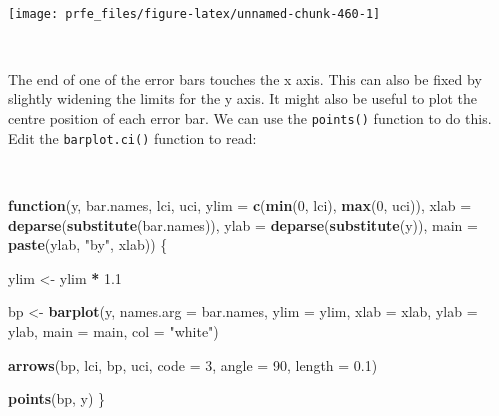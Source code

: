 \documentclass[12pt,a4paper]{book}
\newenvironment{Shaded}{\begin{snugshade}}{\end{snugshade}}
\newcommand{\ControlFlowTok}[1]{\textcolor[rgb]{0.13,0.29,0.53}{\textbf{#1}}}
\newcommand{\DataTypeTok}[1]{\textcolor[rgb]{0.13,0.29,0.53}{#1}}
\newcommand{\DecValTok}[1]{\textcolor[rgb]{0.00,0.00,0.81}{#1}}
\newcommand{\FloatTok}[1]{\textcolor[rgb]{0.00,0.00,0.81}{#1}}
\newcommand{\KeywordTok}[1]{\textcolor[rgb]{0.13,0.29,0.53}{\textbf{#1}}}
\newcommand{\NormalTok}[1]{#1}
\newcommand{\OperatorTok}[1]{\textcolor[rgb]{0.81,0.36,0.00}{\textbf{#1}}}
\newcommand{\StringTok}[1]{\textcolor[rgb]{0.31,0.60,0.02}{#1}}
\theoremstyle{definition}
\theoremstyle{definition}
\theoremstyle{definition}
\theoremstyle{remark}
\begin{document}
~

\begin{Shaded}
\end{Shaded}

\begin{center}\texttt{[image: prfe\_files/figure-latex/unnamed-chunk-460-1]} \end{center}

~

The end of one of the error bars touches the x axis. This can also be
fixed by slightly widening the limits for the y axis. It might also be
useful to plot the centre position of each error bar. We can use the
\texttt{points()} function to do this. Edit the \texttt{barplot.ci()}
function to read:

~

\begin{Shaded}
\begin{Highlighting}[]
\ControlFlowTok{function}\NormalTok{(y, bar.names, lci, uci,}
         \DataTypeTok{ylim =} \KeywordTok{c}\NormalTok{(}\KeywordTok{min}\NormalTok{(}\DecValTok{0}\NormalTok{, lci), }\KeywordTok{max}\NormalTok{(}\DecValTok{0}\NormalTok{, uci)),}
         \DataTypeTok{xlab =} \KeywordTok{deparse}\NormalTok{(}\KeywordTok{substitute}\NormalTok{(bar.names)),}
         \DataTypeTok{ylab =} \KeywordTok{deparse}\NormalTok{(}\KeywordTok{substitute}\NormalTok{(y)),}
         \DataTypeTok{main =} \KeywordTok{paste}\NormalTok{(ylab, }\StringTok{"by"}\NormalTok{, xlab)) \{}
     
\NormalTok{  ylim <-}\StringTok{ }\NormalTok{ylim }\OperatorTok{*}\StringTok{ }\FloatTok{1.1}
     
\NormalTok{  bp <-}\StringTok{ }\KeywordTok{barplot}\NormalTok{(y, }\DataTypeTok{names.arg =}\NormalTok{ bar.names, }\DataTypeTok{ylim =}\NormalTok{ ylim, }\DataTypeTok{xlab =}\NormalTok{ xlab,}
                \DataTypeTok{ylab =}\NormalTok{ ylab, }\DataTypeTok{main =}\NormalTok{ main, }\DataTypeTok{col =} \StringTok{"white"}\NormalTok{)}
     
  \KeywordTok{arrows}\NormalTok{(bp, lci, bp, uci, }\DataTypeTok{code =} \DecValTok{3}\NormalTok{, }\DataTypeTok{angle =} \DecValTok{90}\NormalTok{, }\DataTypeTok{length =} \FloatTok{0.1}\NormalTok{)}
     
  \KeywordTok{points}\NormalTok{(bp, y)}
\NormalTok{\}}
\end{Highlighting}
\end{Shaded}
\end{document}
